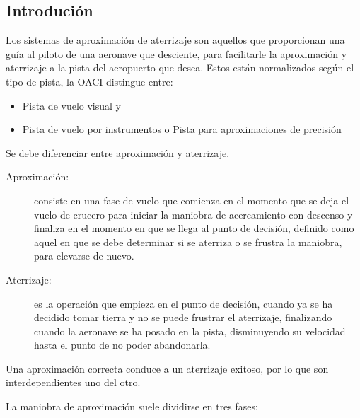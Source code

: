 
\subsection{Introdución}
\label{06.01.introduccion}

Los sistemas de aproximación de aterrizaje son aquellos que proporcionan una guía al piloto de
una aeronave que desciente, para facilitarle la aproximación y aterrizaje a la pista del aeropuerto que
desea. Estos están normalizados según el tipo de pista, la OACI distingue entre:

\begin{itemize}
\item Pista de vuelo visual y
\item Pista de vuelo por instrumentos o Pista para aproximaciones de precisión
\end{itemize}

Se debe diferenciar entre aproximación y aterrizaje.

\begin{description}
\item [Aproximación:] consiste en una fase
de vuelo que comienza en el momento que se deja el vuelo de crucero para iniciar la maniobra de
acercamiento con descenso y finaliza en el momento en que se llega al punto de decisión, definido
como aquel en que se debe determinar si se aterriza o se frustra la maniobra, para elevarse de nuevo.

\item[Aterrizaje:]  es la operación que empieza en el punto de decisión, cuando ya se ha
  decidido tomar tierra y no se puede frustrar el aterrizaje, finalizando cuando la aeronave
  se ha posado en la pista, disminuyendo su velocidad hasta el punto de no poder abandonarla.
\end{description}

Una aproximación correcta conduce a un aterrizaje exitoso, por lo que son interdependientes uno
del otro.

La maniobra de aproximación suele dividirse en tres fases:

